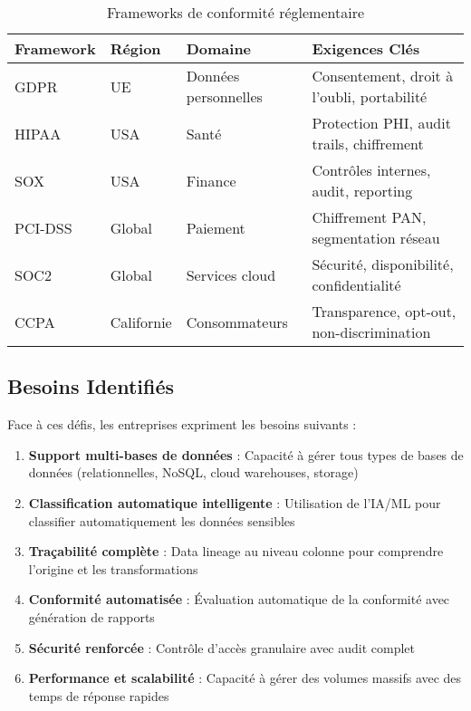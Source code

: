 \begin{table}[htpb]
\centering
\caption{Frameworks de conformité réglementaire}
\label{tab:frameworks_reglementaires}
\begin{tabular}{|p{}|p{}|p{}|p{}|}
\hline
\textbf{Framework} & \textbf{Région} & \textbf{Domaine} & \textbf{Exigences Clés} \\
\hline
GDPR & UE & Données personnelles & Consentement, droit à l'oubli, portabilité \\
\hline
HIPAA & USA & Santé & Protection PHI, audit trails, chiffrement \\
\hline
SOX & USA & Finance & Contrôles internes, audit, reporting \\
\hline
PCI-DSS & Global & Paiement & Chiffrement PAN, segmentation réseau \\
\hline
SOC2 & Global & Services cloud & Sécurité, disponibilité, confidentialité \\
\hline
CCPA & Californie & Consommateurs & Transparence, opt-out, non-discrimination \\
\hline
\end{tabular}
\end{table}

\subsection{Besoins Identifiés}

Face à ces défis, les entreprises expriment les besoins suivants :

\begin{enumerate}
    \item \textbf{Support multi-bases de données} : Capacité à gérer tous types de bases de données (relationnelles, NoSQL, cloud warehouses, storage)
    \item \textbf{Classification automatique intelligente} : Utilisation de l'IA/ML pour classifier automatiquement les données sensibles
    \item \textbf{Traçabilité complète} : Data lineage au niveau colonne pour comprendre l'origine et les transformations
    \item \textbf{Conformité automatisée} : Évaluation automatique de la conformité avec génération de rapports
    \item \textbf{Sécurité renforcée} : Contrôle d'accès granulaire avec audit complet
    \item \textbf{Performance et scalabilité} : Capacité à gérer des volumes massifs avec des temps de réponse rapides
\end{enumerate}

